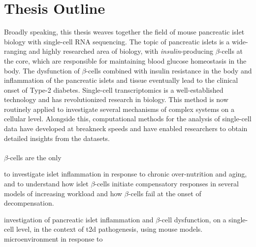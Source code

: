 
\chapter{Thesis Outline}
\label{chapter1}
\newpage

Broadly speaking, this thesis weaves together the field of mouse pancreatic islet biology with single-cell RNA sequencing. The topic of pancreatic islets is a wide-ranging and highly researched area of biology, with \textit{insulin}-producing $\beta$-cells at the core, which are responsible for maintaining blood glucose homeostasis in the body. The dysfunction of $\beta$-cells combined with insulin resistance in the body and inflammation of the pancreatic islets and tissue eventually lead to the clinical onset of Type-2 diabetes. Single-cell transcriptomics is a well-established technology and has revolutionized research in biology. This method is now routinely applied to investigate several mechanisms of complex systems on a cellular level. Alongside this, computational methods for the analysis of single-cell data have developed at breakneck speeds and have enabled researchers to obtain detailed insights from the datasets.\\\\



$\beta$-cells are the only 


to investigate islet inflammation in response to chronic over-nutrition and aging, and to understand how islet $\beta$-cells initiate compensatory responses in several models of increasing workload and how $\beta$-cells fail at the onset of decompensation. 

investigation of pancreatic islet inflammation and $\beta$-cell dysfunction, on a single-cell level, in the context of \gls{t2d} pathogenesis, using mouse models.  microenvironment in response to 
